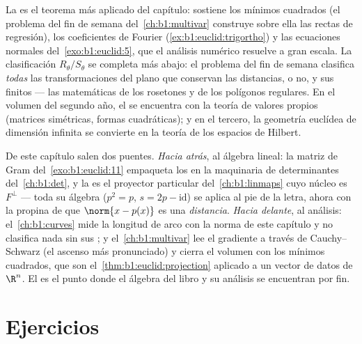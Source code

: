 \begin{remark}
\label{rem:b1:euclid:whereused}
La  es el teorema más aplicado del capítulo:
sostiene los mínimos cuadrados (el problema del fin de semana
del~\cref{ch:b1:multivar} construye sobre ella las rectas de
regresión), los coeficientes de Fourier
(\cref{ex:b1:euclid:trigortho}) y las ecuaciones normales
del~\cref{exo:b1:euclid:5}, que el análisis numérico resuelve a gran
escala. La clasificación $R_\theta / S_\theta$ se completa más abajo:
el problema del fin de semana clasifica \emph{todas} las
transformaciones del plano que conservan las distancias,  o
no, y sus  finitos --- las matemáticas de los rosetones y de
los polígonos regulares. En el volumen del segundo año, el
 se encuentra con la teoría de valores propios
(matrices simétricas, formas cuadráticas); y en el tercero, la
geometría euclídea de dimensión infinita se convierte en la teoría de
los espacios de Hilbert.
\end{remark}

\begin{remark}
\label{rem:b1:euclid:perspectives}
De este capítulo salen dos puentes. \emph{Hacia atrás}, al álgebra
lineal: la matriz de Gram del~\cref{exo:b1:euclid:11} empaqueta los
 en la maquinaria de determinantes
del~\cref{ch:b1:det}, y la  es el proyector
particular del~\cref{ch:b1:linmaps} cuyo núcleo es $F^\perp$ --- toda
su álgebra ($p^2 = p$, $s = 2p - \mathrm{id}$) se aplica al pie de la
letra, ahora con la propina de que $\norm{x - p(x)}$ es una
\emph{distancia}. \emph{Hacia delante}, al análisis:
el~\cref{ch:b1:curves} mide la longitud de arco con la norma de este
capítulo y no clasifica nada sin sus ; y
el~\cref{ch:b1:multivar} lee el gradiente a través de
Cauchy--Schwarz (el ascenso más pronunciado) y cierra el volumen con
los mínimos cuadrados, que son el~\cref{thm:b1:euclid:projection}
aplicado a un vector de datos de $\R^n$. El  es el
punto donde el álgebra del libro y su análisis se encuentran por fin.
\end{remark}

\section{Ejercicios}

